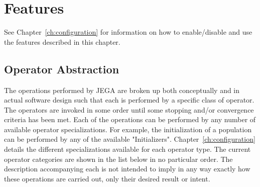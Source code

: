 \chapter{Features} \label{ch:features}
See Chapter~\ref{ch:configuration} for information on how to
enable/disable and use the features described in this chapter.

\section{Operator Abstraction} \label{sec:operator_abstraction}
The operations performed by JEGA are broken up both conceptually and
in actual software design such that each is performed by a specific
class of operator.  The operators are invoked in some order until
some stopping and/or convergence criteria has been met.  Each of the
operations can be performed by any number of available operator
specializations. For example, the initialization of a population can
be performed by any of the available "Initializers".
Chapter~\ref{ch:configuration} details the different specializations
available for each operator type. The current operator categories
are shown in the list below in no particular order.  The description
accompanying each is not intended to imply in any way exactly how
these operations are carried out, only their desired result or
intent.

